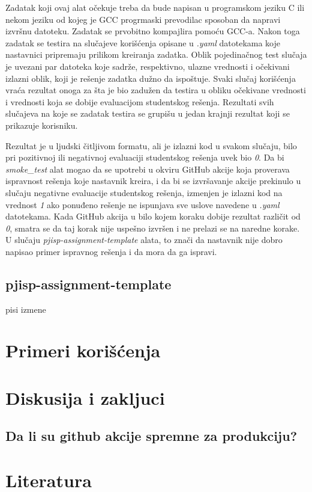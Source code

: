 \documentclass[12pt]{report}
\begin{document}
Zadatak koji ovaj alat očekuje treba da bude napisan u programskom jeziku C ili nekom jeziku od kojeg je GCC progrmaski prevodilac sposoban da napravi izvršnu datoteku. Zadatak se prvobitno kompajlira pomoću GCC-a. Nakon toga zadatak se testira na slučajeve korišćenja opisane u \textit{.yaml} datotekama koje nastavnici pripremaju prilikom kreiranja zadatka. Oblik pojedinačnog test slučaja je uvezani par datoteka koje sadrže, respektivno, ulazne vrednosti i očekivani izlazni oblik, koji je rešenje zadatka dužno da ispoštuje. Svaki slučaj korišćenja vraća rezultat onoga za šta je bio zadužen da testira u obliku očekivane vrednosti i vrednosti koja se dobije evaluacijom studentskog rešenja. Rezultati svih slučajeva na koje se zadatak testira se grupišu u jedan krajnji rezultat koji se prikazuje korisniku.

Rezultat je u ljudski čitljivom formatu, ali je izlazni kod u svakom slučaju, bilo pri pozitivnoj ili negativnoj evaluaciji studentskog rešenja uvek bio \textit{0}. Da bi \textit{smoke\_test} alat mogao da se upotrebi u okviru GitHub akcije koja proverava ispravnost rešenja koje nastavnik kreira, i da bi se izvršavanje akcije prekinulo u slučaju negativne evaluacije studentskog rešenja, izmenjen je izlazni kod na vrednost \textit{1} ako ponuđeno rešenje ne ispunjava sve uslove navedene u \textit{.yaml} datotekama. Kada GitHub akcija u bilo kojem koraku dobije rezultat različit od \textit{0}, smatra se da taj korak nije uspešno izvršen i ne prelazi se na naredne korake. U slučaju \textit{pjisp-assignment-template} alata, to znači da nastavnik nije dobro napisao primer ispravnog rešenja i da mora da ga ispravi.

\section{pjisp-assignment-template}
pisi izmene


\chapter{Primeri korišćenja}
\chapter{Diskusija i zakljuci}
\section{Da li su github akcije spremne za produkciju?}
\chapter{Literatura}
\sloppy
\printbibliography[heading=none]
\end{document}
